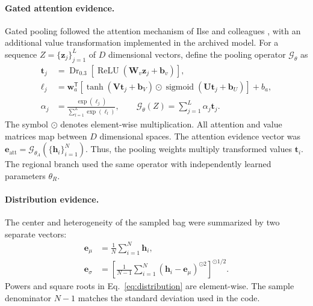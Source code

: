 \paragraph{Gated attention evidence.}
Gated pooling followed the attention mechanism of Ilse and colleagues
\citep{ref5}, with an additional value transformation implemented in the archived
model. For a sequence $Z=\{\mathbf{z}_j\}_{j=1}^{L}$ of $D$ dimensional vectors,
define the pooling operator $\mathcal{G}_{\theta}$ as
\begin{subequations}\label{eq:gated-pool}
\begin{align}
 \mathbf{t}_j &= \operatorname{Dr}_{0.3}
     \!\left[\operatorname{ReLU}(\mathbf{W}_{v}\mathbf{z}_j+\mathbf{b}_{v})\right],
     \label{eq:pool-value}\\
 \ell_j &= \mathbf{w}_{a}^{\mathsf T}
    \left[\tanh(\mathbf{V}\mathbf{t}_j+\mathbf{b}_{V})
     \odot\operatorname{sigmoid}(\mathbf{U}\mathbf{t}_j+\mathbf{b}_{U})\right]+b_a,
     \label{eq:pool-logit}\\
 \alpha_j &= \frac{\exp(\ell_j)}{\sum_{l=1}^{L}\exp(\ell_l)},
 \qquad \mathcal{G}_{\theta}(Z)=\sum_{j=1}^{L}\alpha_j\mathbf{t}_j.
     \label{eq:pool-sum}
\end{align}
\end{subequations}
The symbol $\odot$ denotes element-wise multiplication. All attention and value
matrices map between $D$ dimensional spaces. The attention evidence vector was
$\mathbf{e}_{\mathrm{att}}=\mathcal{G}_{\theta_A}(\{\mathbf{h}_i\}_{i=1}^{N})$.
Thus, the pooling weights multiply transformed values $\mathbf{t}_i$.
The regional branch used the same operator with independently learned parameters
$\theta_R$.

\paragraph{Distribution evidence.}
The center and heterogeneity of the sampled bag were summarized by two separate
vectors:
\begin{subequations}\label{eq:distribution}
\begin{align}
 \mathbf{e}_{\mu} &= \frac{1}{N}\sum_{i=1}^{N}\mathbf{h}_i,\\
 \mathbf{e}_{\sigma} &=
 \left[\frac{1}{N-1}\sum_{i=1}^{N}
       (\mathbf{h}_i-\mathbf{e}_{\mu})^{\odot 2}\right]^{\odot 1/2}.
\end{align}
\end{subequations}
Powers and square roots in Eq.~\eqref{eq:distribution} are element-wise. The
sample denominator $N-1$ matches the standard deviation used in the code.

